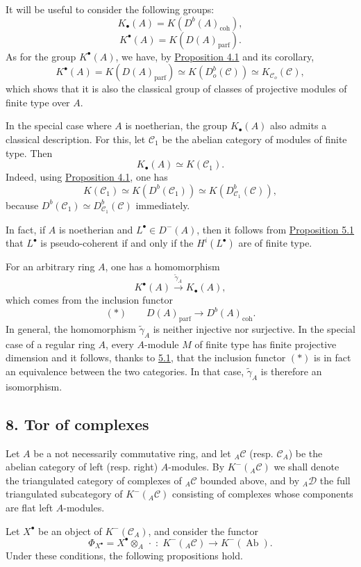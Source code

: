 \documentclass[11pt]{article}
\providecommand{\parf}{\mathrm{parf}}
\providecommand{\coh}{\mathrm{coh}}
\providecommand{\cC}{\mathcal C}
\providecommand{\Ab}{\operatorname{Ab}}
\providecommand{\cC}{\mathcal C}
\providecommand{\cD}{\mathcal D}
\providecommand{\Ab}{\operatorname{Ab}}
\providecommand{\parf}{\mathrm{parf}}
\providecommand{\coh}{\mathrm{coh}}
\begin{document}
It will be useful to consider the following groups:
\[
K_\bullet(A)=K(D^b(A)_{\coh}),
\]
\[
K^\bullet(A)=K(D(A)_{\parf}).
\]
As for the group $K^\bullet(A)$, we have, by \hyperref[sga5:VIII:proposition:4.1]{Proposition 4.1} and its corollary,
\[
K^\bullet(A)=K(D(A)_{\parf})\simeq K(D_o^b(\cC))\simeq K_{\cC_o}(\cC),
\]
which shows that it is also the classical group of classes of projective modules of finite type over $A$.

In the special case where $A$ is noetherian, the group $K_\bullet(A)$ also admits a classical description. For this, let $\cC_1$ be the abelian category of modules of finite type. Then
\[
K_\bullet(A)\simeq K(\cC_1).
\]
Indeed, using \hyperref[sga5:VIII:proposition:4.1]{Proposition 4.1}, one has
\[
K(\cC_1)\simeq K(D^b(\cC_1))\simeq K(D^b_{\cC_1}(\cC)),
\]
because $D^b(\cC_1)\simeq D^b_{\cC_1}(\cC)$ immediately.

In fact, if $A$ is noetherian and $L^\bullet\in D^-(A)$, then it follows from \hyperref[sga5:VIII:proposition:5.1]{Proposition 5.1} that $L^\bullet$ is pseudo-coherent if and only if the $H^i(L^\bullet)$ are of finite type.

For an arbitrary ring $A$, one has a homomorphism
\[
K^\bullet(A)\xrightarrow{\widetilde\gamma_A}K_\bullet(A),
\]
which comes from the inclusion functor
\[
(*)\qquad D(A)_{\parf}\longrightarrow D^b(A)_{\coh}.
\]
In general, the homomorphism $\widetilde\gamma_A$ is neither injective nor surjective. In the special case of a regular ring $A$, every $A$-module $M$ of finite type has finite projective dimension and it follows, thanks to \hyperref[sga5:VIII:proposition:5.1]{5.1}, that the inclusion functor $(*)$ is in fact an equivalence between the two categories. In that case, $\widetilde\gamma_A$ is therefore an isomorphism.

\subsection*{8. Tor of complexes}\label{sga5:VIII:subsection:8}

Let $A$ be a not necessarily commutative ring, and let ${}_A\cC$ (resp. $\cC_A$) be the abelian category of left (resp. right) $A$-modules. By $K^-({}_A\cC)$ we shall denote the triangulated category of complexes of ${}_A\cC$ bounded above, and by ${}_A\cD$ the full triangulated subcategory of $K^-({}_A\cC)$ consisting of complexes whose components are flat left $A$-modules.

Let $X^\bullet$ be an object of $K^-(\cC_A)$, and consider the functor
\[
\Phi_{X^\bullet}=X^\bullet\otimes_A\,\cdot\;:\;K^-({}_A\cC)\longrightarrow K^-(\Ab).
\]
Under these conditions, the following propositions hold.
\end{document}
